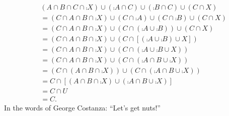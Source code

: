 \documentclass[12pt]{book}
\begin{document}
\begin{enumerate}
\begin{enumerate}
	{\begin{align*}&(A \cap B \cap C \cap \comp{X}) \cup (\comp{A} \cap C) \cup (\comp{B} \cap C) \cup (C \cap X)\\&= (C \cap A \cap B \cap \comp{X}) \cup (C \cap \comp{A}) \cup (C \cap \comp{B}) \cup (C \cap X)\\&= (C \cap A \cap B \cap \comp{X}) \cup (C \cap (\comp{A} \cup \comp{B})) \cup (C \cap X)\\&= (C \cap A \cap B \cap \comp{X}) \cup (C \cap [(\comp{A} \cup \comp{B}) \cup X])\\&= (C \cap A \cap B \cap \comp{X}) \cup (C \cap (\comp{A} \cup \comp{B} \cup X))\\&= (C \cap A \cap B \cap \comp{X}) \cup (C \cap (\comp{A \cap B \cup \comp{X}}))\\&= (C \cap (A \cap B \cap \comp{X})) \cup (C \cap (\comp{A \cap B \cup \comp{X}}))\\&= C \cap [(A \cap B \cap \comp{X}) \cup (\comp{A \cap B \cup \comp{X}})]\\&= C \cap U\\&= C.\end{align*}}\pagebreak
	{In the words of George Costanza: ``Let's get nuts!''
}
\end{enumerate}
\end{enumerate}
\end{document}
